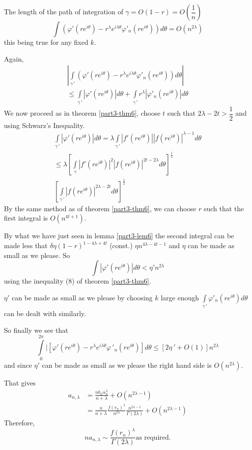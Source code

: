 The length of the path of integration of
$\gamma=O(1-r)=O\left(\dfrac{1}{n}\right)$
$$
\int\left(\varphi'(re^{i\theta})-r^{\lambda}e^{i\lambda\theta}\varphi'_{n}
(re^{i\theta}) \right) d\theta=O(n^{2\lambda}) 
$$
this being true for any fixed $k$.

Again,
\begin{gather*}
|\int\limits_{\gamma \, '}
\left(\varphi'(re^{i\theta}) -
r^{\lambda}e^{i\lambda\theta}\varphi'_{n}(re^{i\theta}) \right)d\theta|\\
\leq \int\limits_{\gamma
  \,'}|\varphi'(re^{i\theta})|d\theta+\int\limits_{\gamma\, '}r^{\lambda}|\varphi'_{n}(re^{i\theta})|d\theta
\end{gather*}
We now proceed as in theorem \ref{part3-thm6}, choose $t$ such that
$2\lambda-2t>\dfrac{1}{2}$ and using Schwarz's Inequality.
\begin{gather*}
\int\limits_{\gamma\, '}|\varphi'(re^{i\theta})|d\theta =
\lambda\int\limits_{\gamma \, '} |f'(re^{i\theta})|
|f(re^{i\theta})|^{\lambda-1}d\theta\\  
\leq \lambda
\left[\int\limits_{\gamma}|f'(re^{i\theta})|^{2}|f(re^{i\theta})|^{2t-2\lambda}d\theta\right]^{\frac{1}{2}}\\
\left[\int\limits_{\gamma \, '}|f(re^{i\theta})|^{2\lambda-2t}d\theta\right]^{\frac{1}{2}} 
\end{gather*}
By the same method as of theorem \ref{part3-thm6}, we can choose $r$
such that the first integral is $O(n^{4t+1})$.

By what we have just seen in lemma \ref{part3-lem6} the second
integral can be made less that $\delta\eta(1-r)^{1-4\lambda+4t}$ \ie
(const.) $\eta n^{4\lambda-4t-1}$ and $\eta$ can be made as small as
we please. So 
$$
\int|\varphi'(re^{i\theta})|d\theta<\eta'n^{2\lambda}
$$\pageoriginale
using the inequality (8) of theorem \ref{part3-thm6}.

$\eta'$ can be made as small as we please by choosing $k$ large enough
$\int\limits_{\gamma \, '}\varphi'_{n}(re^{i\theta})d\theta$ can be
dealt with similarly.

So finally we see that
$$
\int\limits^{2\pi}_{0}| [\varphi'(re^{i\theta}) - r^{\lambda}
e^{i\lambda\theta} \varphi \,'_{n}(re^{i\theta})]d\theta\leq
[2\eta\, ' + O (1)]n^{2\lambda}
$$
and since $\eta'$ can be made as small as we please the right hand
side is $O(n^{2\lambda})$.

That gives 
\begin{align*}
a_{n,\lambda} &=
\frac{nb_{n}\alpha^{\lambda}_{n}}{n+\lambda} + O(n^{2\lambda-1})\\
&=
\frac{n}{n+\lambda}\frac{f(r_{n})^{\lambda}}{n^{2\lambda}}
\frac{n^{2\lambda-1}}{\Gamma(2\lambda)}+O(n^{2\lambda-1}) 
\end{align*}
Therefore,
$$
na_{n,\lambda}\sim \dfrac{f(r_{n})^{\lambda}}{\Gamma(2\lambda)}\text{
  \ as required.}
$$

